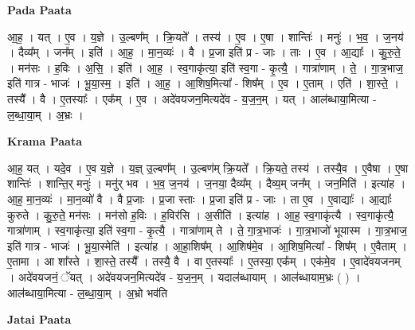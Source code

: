 \documentclass[17pt]{extarticle}
\begin{document}
\textbf{Pada Paata} \newline

आ॒ह॒ । यत् । ए॒व । य॒ज्ञे । उ॒ल्बण᳚म् । क्रि॒यते᳚ । तस्य॑ । ए॒व । ए॒षा । शान्तिः॑ । मनुः॑ । भ॒व॒ । ज॒नय॑ । दैव्य᳚म् । जन᳚म् । इति॑ । आ॒ह॒ । मा॒न॒व्यः॑ । वै । प्र॒जा इति॑ प्र - जाः । ताः । ए॒व । आ॒द्याः᳚ । कु॒रु॒ते॒ । मन॑सः । ह॒विः । अ॒सि॒ । इति॑ । आ॒ह॒ । स्व॒गाकृ॑त्या॒ इति॑ स्व॒गा - कृ॒त्यै॒ । गात्रा॑णाम् । ते॒ । गा॒त्र॒भाज॒ इति॑ गात्र - भाजः॑ । भू॒या॒स्म॒ । इति॑ । आ॒ह॒ । आ॒शिष॒मित्या᳚ - शिष᳚म् । ए॒व । ए॒ताम् । एति॑ । शा॒स्ते॒ । तस्यै᳚ । वै । ए॒तस्याः᳚ । एक᳚म् । ए॒व । अदे॑वयजन॒मित्यदे॑व - य॒ज॒न॒म् । यत् । आल॑ब्धाया॒मित्या - ल॒ब्धा॒या॒म् । अ॒भ्रः ।  \newline


\textbf{Krama Paata} \newline

आ॒ह॒ यत् । यदे॒व । ए॒व य॒ज्ञे । य॒ज्ञ् उ॒ल्बण᳚म् । उ॒ल्बण॑म् क्रि॒यते᳚ । क्रि॒यते॒ तस्य॑ । तस्यै॒व । ए॒वैषा । ए॒षा शान्तिः॑ । शान्ति॒र् मनुः॑ । मनु॑र् भव । भ॒व॒ ज॒नय॑ । ज॒नया॒ दैव्य᳚म् । दैव्य॒म् जन᳚म् । जन॒मिति॑ । इत्या॑ह । आ॒ह॒ मा॒न॒व्यः॑ । मा॒न॒व्यो॑ वै । वै प्र॒जाः । प्र॒जा स्ताः । प्र॒जा इति॑ प्र - जाः । ता ए॒व । ए॒वाद्याः᳚ । आ॒द्याः᳚ कुरुते । कु॒रु॒ते॒ मन॑सः । मन॑सो ह॒विः । ह॒विर॑सि । अ॒सीति॑ । इत्या॑ह । आ॒ह॒ स्व॒गाकृ॑त्यै । स्व॒गाकृ॑त्यै॒ गात्रा॑णाम् । स्व॒गाकृ॑त्या॒ इति॑ स्व॒गा - कृ॒त्यै॒ । गात्रा॑णाम् ते । ते॒ गा॒त्र॒भाजः॑ । गा॒त्र॒भाजो॑ भूयास्म । गा॒त्र॒भाज॒ इति॑ गात्र - भाजः॑ । भू॒या॒स्मेति॑ । इत्या॑ह । आ॒हा॒शिष᳚म् । आ॒शिष॑मे॒व । आ॒शिष॒मित्या᳚ - शिष᳚म् । ए॒वैताम् । ए॒तामा । आ शा᳚स्ते । शा॒स्ते॒ तस्यै᳚ । तस्यै॒ वै । वा ए॒तस्याः᳚ । ए॒तस्या॒ एक᳚म् । एक॑मे॒व । ए॒वादे॑वयजनम् । अदे॑वयजनं॒ ॅयत् । अदे॑वयजन॒मित्यदे॑व - य॒ज॒न॒म् । यदाल॑ब्धायाम् । आल॑ब्धायाम॒भ्रः ( ) । आल॑ब्धाया॒मित्या - ल॒ब्धा॒या॒म् । अ॒भ्रो भव॑ति \newline

\textbf{Jatai Paata} \newline
\end{document}

